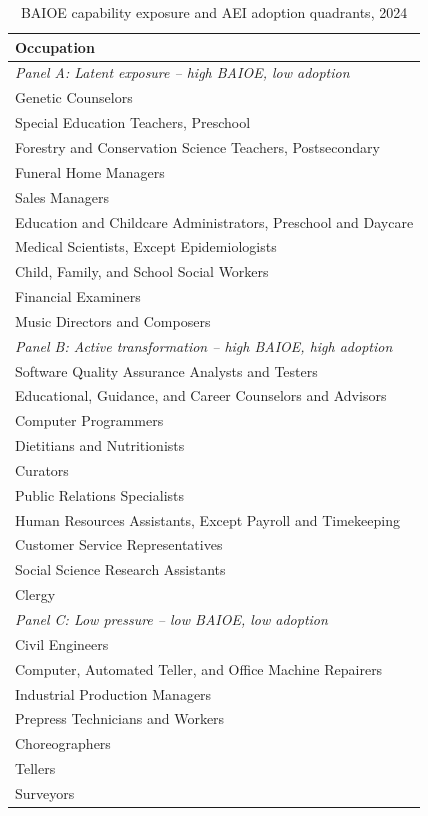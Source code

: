 \begin{table}[htbp]\centering
\caption{BAIOE capability exposure and AEI adoption quadrants, 2024}\label{tab:quadrants}
\begin{tabular}{l}\toprule
Occupation \\ \midrule
\textit{Panel A: Latent exposure -- high BAIOE, low adoption} \\
Genetic Counselors \\
Special Education Teachers, Preschool \\
Forestry and Conservation Science Teachers, Postsecondary \\
Funeral Home Managers \\
Sales Managers \\
Education and Childcare Administrators, Preschool and Daycare \\
Medical Scientists, Except Epidemiologists \\
Child, Family, and School Social Workers \\
Financial Examiners \\
Music Directors and Composers \\
\textit{Panel B: Active transformation -- high BAIOE, high adoption} \\
Software Quality Assurance Analysts and Testers \\
Educational, Guidance, and Career Counselors and Advisors \\
Computer Programmers \\
Dietitians and Nutritionists \\
Curators \\
Public Relations Specialists \\
Human Resources Assistants, Except Payroll and Timekeeping \\
Customer Service Representatives \\
Social Science Research Assistants \\
Clergy \\
\textit{Panel C: Low pressure -- low BAIOE, low adoption} \\
Civil Engineers \\
Computer, Automated Teller, and Office Machine Repairers \\
Industrial Production Managers \\
Prepress Technicians and Workers \\
Choreographers \\
Tellers \\
Surveyors \\

\end{tabular}
\end{table}
